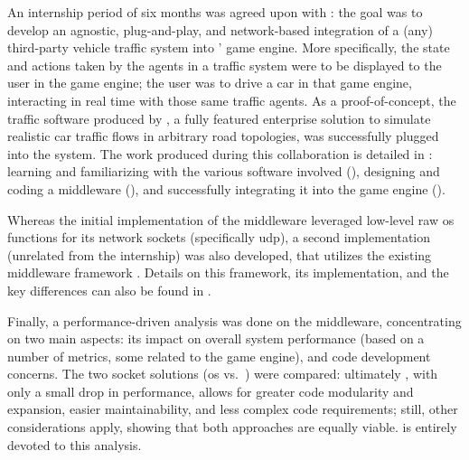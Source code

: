 An internship period of six months was agreed upon with : the goal was to develop an agnostic, plug-and-play, and network-based integration of a (any) third-party vehicle traffic system into ' game engine. More specifically, the state and actions taken by the agents in a traffic system were to be displayed to the user in the game engine; the user was to drive a car in that game engine, interacting in real time with those same traffic agents. As a proof-of-concept, the traffic software produced by , a fully featured enterprise solution to simulate realistic car traffic flows in arbitrary road topologies, was successfully plugged into the system. The work produced during this collaboration is detailed in : learning and familiarizing with the various software involved (), designing and coding a \gls{middleware} (), and successfully integrating it into the game engine ().

Whereas the initial implementation of the \gls{middleware} leveraged low-level raw \gls{os} functions for its network sockets (specifically \gls{udp}), a second implementation (unrelated from the internship) was also developed, that utilizes the existing \gls{middleware} framework . Details on this framework, its implementation, and the key differences can also be found in .

Finally, a performance-driven analysis was done on the \gls{middleware}, concentrating on two main aspects: its impact on overall system performance (based on a number of metrics, some related to the game engine), and code development concerns. The two socket solutions (\gls{os} vs.\ ) were compared: ultimately , with only a small drop in performance, allows for greater code modularity and expansion, easier maintainability, and less complex code requirements; still, other considerations apply, showing that both approaches are equally viable.  is entirely devoted to this analysis.
